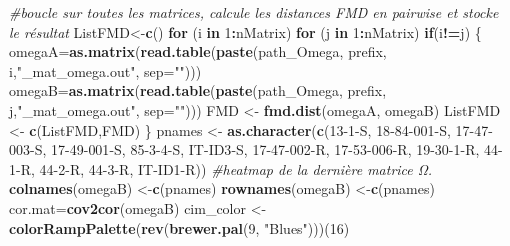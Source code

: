 \documentclass[
  openany]{book}
\newenvironment{Shaded}{\begin{snugshade}}{\end{snugshade}}
\newcommand{\AttributeTok}[1]{\textcolor[rgb]{0.13,0.29,0.53}{#1}}
\newcommand{\CommentTok}[1]{\textcolor[rgb]{0.56,0.35,0.01}{\textit{#1}}}
\newcommand{\ControlFlowTok}[1]{\textcolor[rgb]{0.13,0.29,0.53}{\textbf{#1}}}
\newcommand{\DecValTok}[1]{\textcolor[rgb]{0.00,0.00,0.81}{#1}}
\newcommand{\FunctionTok}[1]{\textcolor[rgb]{0.13,0.29,0.53}{\textbf{#1}}}
\newcommand{\NormalTok}[1]{#1}
\newcommand{\OtherTok}[1]{\textcolor[rgb]{0.56,0.35,0.01}{#1}}
\newcommand{\SpecialCharTok}[1]{\textcolor[rgb]{0.81,0.36,0.00}{\textbf{#1}}}
\newcommand{\StringTok}[1]{\textcolor[rgb]{0.31,0.60,0.02}{#1}}
\theoremstyle{definition}
\theoremstyle{definition}
\theoremstyle{definition}
\theoremstyle{definition}
\theoremstyle{remark}
\begin{document}
\begin{Shaded}
\begin{Highlighting}[]
\CommentTok{\#boucle sur toutes les matrices, calcule les distances FMD en pairwise et stocke le résultat}
\NormalTok{ListFMD}\OtherTok{\textless{}{-}}\FunctionTok{c}\NormalTok{()}
\ControlFlowTok{for}\NormalTok{ (i }\ControlFlowTok{in} \DecValTok{1}\SpecialCharTok{:}\NormalTok{nMatrix) }\ControlFlowTok{for}\NormalTok{ (j }\ControlFlowTok{in} \DecValTok{1}\SpecialCharTok{:}\NormalTok{nMatrix) }\ControlFlowTok{if}\NormalTok{(i}\SpecialCharTok{!=}\NormalTok{j) \{}
\NormalTok{omegaA}\OtherTok{=}\FunctionTok{as.matrix}\NormalTok{(}\FunctionTok{read.table}\NormalTok{(}\FunctionTok{paste}\NormalTok{(path\_Omega, prefix, i,}\StringTok{"\_mat\_omega.out"}\NormalTok{, }\AttributeTok{sep=}\StringTok{""}\NormalTok{)))}
\NormalTok{omegaB}\OtherTok{=}\FunctionTok{as.matrix}\NormalTok{(}\FunctionTok{read.table}\NormalTok{(}\FunctionTok{paste}\NormalTok{(path\_Omega, prefix, j,}\StringTok{"\_mat\_omega.out"}\NormalTok{, }\AttributeTok{sep=}\StringTok{""}\NormalTok{)))}
\NormalTok{FMD }\OtherTok{\textless{}{-}} \FunctionTok{fmd.dist}\NormalTok{(omegaA, omegaB)}
\NormalTok{ListFMD }\OtherTok{\textless{}{-}} \FunctionTok{c}\NormalTok{(ListFMD,FMD)}
\NormalTok{\}}
\NormalTok{pnames }\OtherTok{\textless{}{-}} \FunctionTok{as.character}\NormalTok{(}\FunctionTok{c}\NormalTok{(}\StringTok{\textquotesingle{}13{-}1{-}S\textquotesingle{}}\NormalTok{, }\StringTok{\textquotesingle{}18{-}84{-}001{-}S\textquotesingle{}}\NormalTok{, }\StringTok{\textquotesingle{}17{-}47{-}003{-}S\textquotesingle{}}\NormalTok{, }\StringTok{\textquotesingle{}17{-}49{-}001{-}S\textquotesingle{}}\NormalTok{, }\StringTok{\textquotesingle{}85{-}3{-}4{-}S\textquotesingle{}}\NormalTok{, }\StringTok{\textquotesingle{}IT{-}ID3{-}S\textquotesingle{}}\NormalTok{, }\StringTok{\textquotesingle{}17{-}47{-}002{-}R\textquotesingle{}}\NormalTok{, }\StringTok{\textquotesingle{}17{-}53{-}006{-}R\textquotesingle{}}\NormalTok{, }\StringTok{\textquotesingle{}19{-}30{-}1{-}R\textquotesingle{}}\NormalTok{, }\StringTok{\textquotesingle{}44{-}1{-}R\textquotesingle{}}\NormalTok{, }\StringTok{\textquotesingle{}44{-}2{-}R\textquotesingle{}}\NormalTok{, }\StringTok{\textquotesingle{}44{-}3{-}R\textquotesingle{}}\NormalTok{, }\StringTok{\textquotesingle{}IT{-}ID1{-}R\textquotesingle{}}\NormalTok{))}
\CommentTok{\#heatmap de la dernière matrice Ω.}
\FunctionTok{colnames}\NormalTok{(omegaB) }\OtherTok{\textless{}{-}}\FunctionTok{c}\NormalTok{(pnames)}
\FunctionTok{rownames}\NormalTok{(omegaB) }\OtherTok{\textless{}{-}}\FunctionTok{c}\NormalTok{(pnames)}
\NormalTok{cor.mat}\OtherTok{=}\FunctionTok{cov2cor}\NormalTok{(omegaB)}
\NormalTok{cim\_color }\OtherTok{\textless{}{-}} \FunctionTok{colorRampPalette}\NormalTok{(}\FunctionTok{rev}\NormalTok{(}\FunctionTok{brewer.pal}\NormalTok{(}\DecValTok{9}\NormalTok{, }\StringTok{"Blues"}\NormalTok{)))(}\DecValTok{16}\NormalTok{)}

\end{Highlighting}
\end{Shaded}
\end{document}
